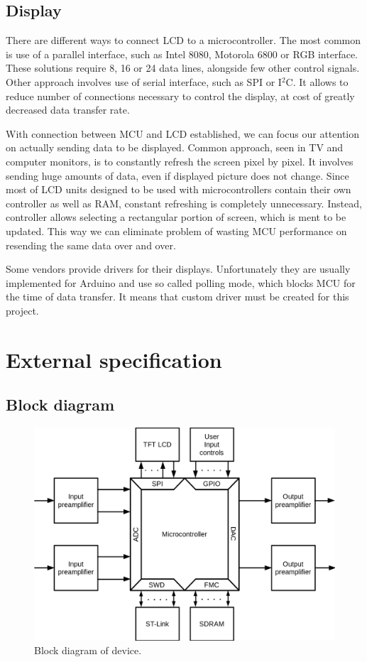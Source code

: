 \documentclass[a4paper,twoside,12pt]{book}
\begin{document}
\section{Display}
There are different ways to connect LCD to a microcontroller.
The most common is use of a parallel interface,
such as Intel 8080, Motorola 6800 or RGB interface.
These solutions require 8, 16 or 24 data lines,
alongside few other control signals.
Other approach involves use of serial interface,
such as SPI or I\(^2\)C.
It allows to reduce number of connections necessary to control the display,
at cost of greatly decreased data transfer rate.

With connection between MCU and LCD established,
we can focus our attention on actually sending data to be displayed.
Common approach, seen in TV and computer monitors,
is to constantly refresh the screen pixel by pixel.
It involves sending huge amounts of data,
even if displayed picture does not change.
Since most of LCD units designed to be used with microcontrollers
contain their own controller as well as RAM,
constant refreshing is completely unnecessary.
Instead, controller allows selecting a rectangular portion
of screen, which is ment to be updated.
This way we can eliminate problem of wasting MCU performance
on resending the same data over and over.

Some vendors provide drivers for their displays.
Unfortunately they are usually implemented for Arduino
and use so called polling mode,
which blocks MCU for the time of data transfer.
It means that custom driver must be created for this project.


\chapter{External specification}

\section{Block diagram}

\begin{figure}[H]
    \centering
    \includegraphics[width=\textwidth]{images/Block}
    \caption{Block diagram of device.}
    \label{fig:block}
\end{figure}
\end{document}
